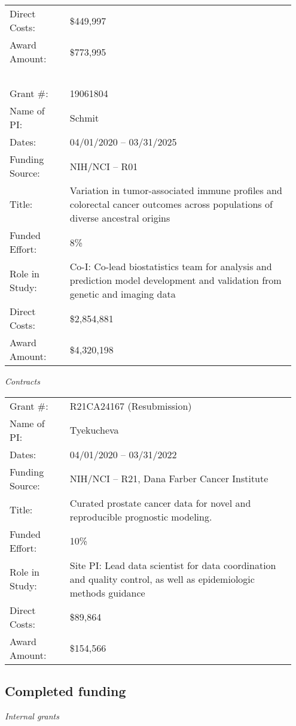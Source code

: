 \documentclass[11pt, a4paper]{article} %
\begin{document}
\begin{longtable}{@{}p{0.2\linewidth} p{0.75\linewidth}}
Direct Costs: & \$449,997\\
Award Amount: & \$773,995\\
~\\
Grant \#: & 19061804\\
Name of PI: & Schmit\\
Dates: & 04/01/2020 -- 03/31/2025\\
Funding Source: &NIH/NCI -- R01\\
Title: & Variation in tumor-associated immune profiles and colorectal cancer outcomes across populations of diverse ancestral origins\\
Funded Effort: & 8\%\\
Role in Study: & Co-I: Co-lead biostatistics team for analysis and prediction model development and validation from genetic and imaging data\\
Direct Costs: & \$2,854,881\\
Award Amount: & \$4,320,198\\
\end{longtable}


\emph{Contracts}
\begin{longtable}{@{}p{0.2\linewidth} p{0.75\linewidth}}
Grant \#: & R21CA24167 (Resubmission)\\
Name of PI: & Tyekucheva\\
Dates: & 04/01/2020 -- 03/31/2022\\
Funding Source: & NIH/NCI -- R21, Dana Farber Cancer Institute\\
Title: & Curated prostate cancer data for novel and reproducible prognostic modeling.\\
Funded Effort: & 10\%\\
Role in Study: & Site PI:  Lead data scientist for data coordination and quality control, as well as epidemiologic methods guidance\\
Direct Costs: & \$89,864\\
Award Amount: & \$154,566\\
\end{longtable}

\subsection*{Completed funding}
\emph{Internal grants}
\end{document}
